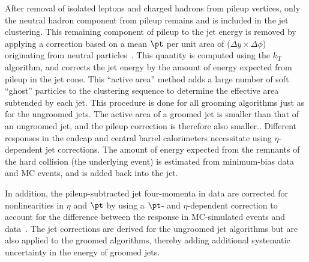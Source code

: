 After removal of isolated leptons and charged hadrons 
from pileup vertices, only the
neutral hadron component from pileup remains and is included in the
jet clustering. %
This remaining component of pileup to the jet energy is removed by
applying a
correction based on a 
mean $\pt$ per unit area of ($\Delta y \times \Delta \phi$) 
originating
from neutral particles~\cite{jetarea_fastjet,jetarea_fastjet_pu}.
This quantity is computed using
the $k_{\mathrm T}$ 
algorithm, and corrects the jet energy
by the amount of energy expected from pileup in the jet cone. 
This ``active area'' method adds a large number of 
soft ``ghost'' particles to the
clustering sequence to determine the effective area subtended by each
jet. 
This procedure is done for all grooming algorithms just
as for the ungroomed jets. 
The active area of a groomed jet is smaller than that of an ungroomed jet, and the pileup correction is therefore also smaller.. 
Different responses in the endcap and central barrel calorimeters 
necessitate using $\eta$-dependent jet corrections. 
The amount of energy expected from the remnants of the hard collision
(the underlying
event) is estimated from minimum-bias data and MC events, and
is added back into the jet. 



In addition, the pileup-subtracted jet four-momenta in data are
corrected for nonlinearities in $\eta$ and $\pt$ by using a
$\pt$- and $\eta$-dependent correction to account for the difference 
between the response in MC-simulated events and 
data~\cite{citeJEC}.  
The jet corrections are derived for the ungroomed
jet algorithms but are also applied to the groomed algorithms, thereby adding 
additional systematic uncertainty in the energy of groomed jets. 




